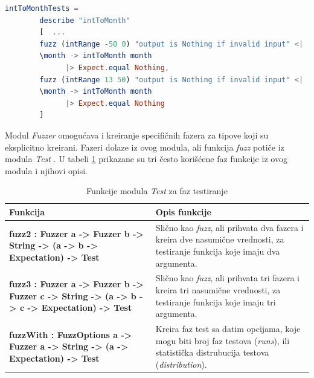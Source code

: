 \documentclass[12pt,oneside]{memoir}
\begin{document}
\begin{lstlisting}[language=elm, caption={Implementacija faz testova za funkciju \emph{intToMonth}},captionpos=b, label={lst:faztest}]
intToMonthTests =
        describe "intToMonth"
        [  ...
        fuzz (intRange -50 0) "output is Nothing if invalid input" <|
        \month -> intToMonth month
              |> Expect.equal Nothing, 
        fuzz (intRange 13 50) "output is Nothing if invalid input" <|
        \month -> intToMonth month
              |> Expect.equal Nothing
        ]
\end{lstlisting}

\par Modul \emph{Fuzzer} omogućava i kreiranje specifičnih fazera za tipove koji su eksplicitno kreirani. Fazeri dolaze iz ovog modula, ali funkcija \emph{fuzz} potiče iz modula \emph{Test} \cite{testmodul}. U tabeli \ref{tab:fuzzer} prikazane su tri često korišćene faz funkcije iz ovog modula i njihovi opisi.

\begin{table}[!htbp]
\centering
\caption{Funkcije modula \emph{Test} za faz testiranje}
\label{tab:fuzzer}
\begin{center}
\begin{tabular}{ | m{10cm} | m{10em} | } 
 \hline
\textbf{Funkcija} &  \textbf{Opis funkcije} \\ 
  \hline
 \small{\textbf{fuzz2 : Fuzzer a -> Fuzzer b -> String -> (a -> b -> Expectation) -> Test}} & \small{Slično kao \emph{fuzz}, ali prihvata dva fazera i kreira dve nasumične vrednosti, za testiranje funkcija koje imaju dva argumenta.} \\ 
  \hline
   \small{\textbf{fuzz3 :
    Fuzzer a
    -> Fuzzer b
    -> Fuzzer c
    -> String
    -> (a -> b -> c -> Expectation)
    -> Test}} & \small{Slično kao \emph{fuzz}, ali prihvata tri fazera i kreira tri nasumične vrednosti, za testiranje funkcija koje imaju tri argumenta.} \\ 
  \hline
 \small{\textbf{fuzzWith : FuzzOptions a -> Fuzzer a -> String -> (a -> Expectation) -> Test}} & \small{Kreira faz test sa datim opcijama, koje mogu biti broj faz testova (\textit{runs}), ili statistička distrubucija testova (\textit{distribution}).}  \\ 
\hline

\end{tabular}
\end{center}
\end{table}
\end{document}
